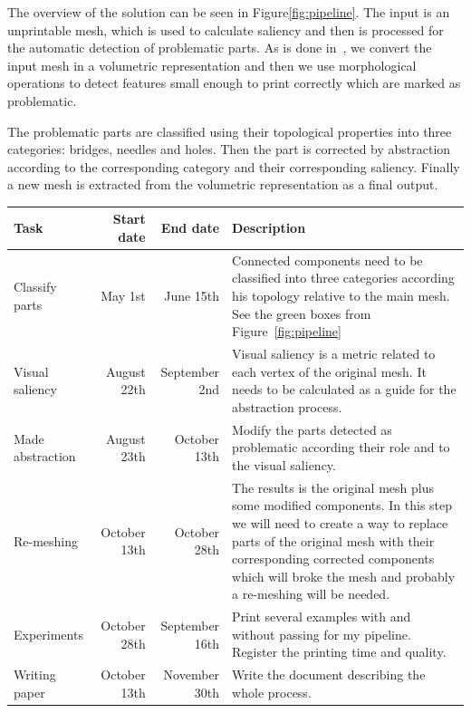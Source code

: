 \begin{enumerate}
	The overview of the solution can be seen in Figure\ref{fig:pipeline}. The input is an unprintable mesh, which is used to calculate saliency and then is processed for the automatic detection of problematic parts. As is done in~\cite{Telea2011}, we convert the input mesh in a volumetric representation and then we use morphological operations to detect features small enough to print correctly which are marked as problematic.
	
	The problematic parts are classified using their topological properties into three categories: bridges, needles and holes. Then the part is corrected by abstraction according to the corresponding category and their corresponding saliency. Finally a new mesh is extracted from the volumetric representation as a final output.
	
	\begin{center}
    \begin{tabular}{| l | r | r || p{9cm} |}
    \hline
			Task & Start date & End date & Description \\ 
			\hline
			Classify parts & May 1st & June 15th & Connected components need to be classified into three categories according his topology relative to the main mesh. See the green boxes from Figure~\ref{fig:pipeline}\\ 
			Visual saliency & August 22th & September 2nd & Visual saliency is a metric related to each vertex of the original mesh. It needs to be calculated as a guide for the abstraction process.\\ 
			Made abstraction & August 23th & October 13th & Modify the parts detected as problematic according their role and to the visual saliency. \\ 
			Re-meshing & October 13th & October 28th & The results is the original mesh plus some modified components. In this step we will need to create a way to replace parts of the original mesh with their corresponding corrected components which will broke the mesh and probably a re-meshing will be needed. \\ 
			Experiments & October 28th & September 16th & Print several examples with and without passing for my pipeline. Register the printing time and quality. \\ 
			Writing paper & October 13th & November 30th & Write the document describing the whole process. \\ 
			\hline
    \end{tabular}
	\end{center}
	

\end{enumerate}

